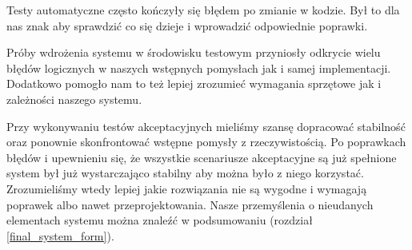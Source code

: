 \documentclass[../analiza-rozwiazania.tex]{subfiles}
\begin{document}
Testy automatyczne często kończyły się błędem po zmianie w kodzie.
Był to dla nas znak aby sprawdzić co się dzieje i wprowadzić odpowiednie poprawki.

Próby wdrożenia systemu w środowisku testowym przyniosły odkrycie wielu błędów logicznych w naszych wstępnych pomysłach jak i samej implementacji.
Dodatkowo pomogło nam to też lepiej zrozumieć wymagania sprzętowe jak i zależności naszego systemu.

Przy wykonywaniu testów akceptacyjnych mieliśmy szansę dopracować stabilność oraz ponownie skonfrontować wstępne pomysły z rzeczywistością.
Po poprawkach błędów i upewnieniu się, że wszystkie scenariusze akceptacyjne są już spełnione system był już wystarczająco stabilny aby można było z niego korzystać.
Zrozumieliśmy wtedy lepiej jakie rozwiązania nie są wygodne i wymagają poprawek albo nawet przeprojektowania.
Nasze przemyślenia o nieudanych elementach systemu można znaleźć w podsumowaniu (rozdział \ref{final_system_form}).
\end{document}
